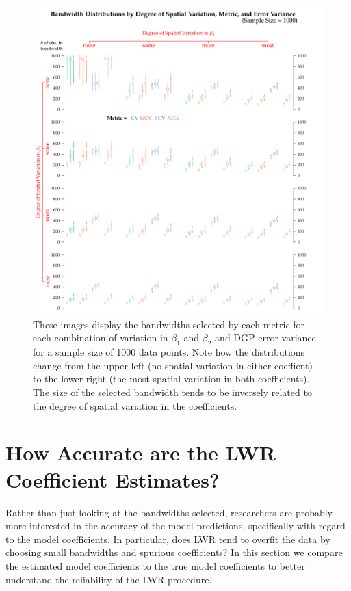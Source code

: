 \documentclass{article}\usepackage{graphicx, color}
\begin{document}
\begin{figure}
\centerline{\includegraphics{figure/bandwidthsSS1000bySpatVarError.pdf}}
\caption{These images display the bandwidths selected by each metric for each combination of variation in $\beta _1$ and $\beta _2$ and DGP error variance for a sample size of 1000 data points. Note how the distributions change from the upper left (no spatial variation in either coeffient) to the lower right (the most spatial variation in both coefficients). The size of the selected bandwidth tends to be inversely related to the degree of spatial variation in the coefficients.}
\label{fig:bandwidthsSS1000bySpatVarError}
\end{figure}


\section{How Accurate are the LWR Coefficient Estimates?}

Rather than just looking at the bandwidths selected, researchers are probably more interested in the accuracy of the model predictions, specifically with regard to the model coefficients. In particular, does LWR tend to overfit the data by choosing small bandwidths and spurious coefficients? In this section we compare the estimated model coefficients to the true model coefficients to better understand the reliability of the LWR procedure.
\end{document}
